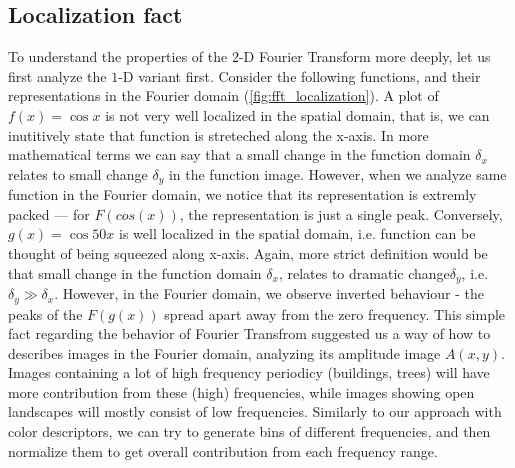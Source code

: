 \documentclass{report}
\begin{document}
\subsection{Localization fact}
To understand the properties of the $2$-D Fourier Transform more deeply, let us first analyze the $1$-D variant first. Consider the following functions, and their representations in the Fourier domain (\ref{fig:fft_localization}). A plot of $f(x)=\cos {x}$ is not very well localized in the spatial domain, that is, we can inutitively state that function is streteched along the x-axis. In more mathematical terms we can say that a small change in the function domain $\delta_x$ relates to small change $\delta_y$ in the function image.  However, when we analyze same function in the Fourier domain, we notice that its representation is extremly packed --- for $F(cos(x))$, the representation is just a single peak. Conversely, $g(x)=\cos {50x}$ is well localized in the spatial domain, i.e. function can be thought of being squeezed along x-axis. Again, more strict definition would be that small change in the function domain $\delta_x$, relates to dramatic change$\delta_y$, i.e. $\delta_y \gg \delta_x$. However, in the Fourier domain, we observe inverted behaviour - the peaks of the $F(g(x))$ spread apart away from the zero frequency. This simple fact regarding the behavior of Fourier Transfrom suggested us a way of how to describes images in the Fourier domain, analyzing its amplitude image $A(x,y)$. Images containing a lot of high frequency periodicy (buildings, trees) will have more contribution from these (high) frequencies, while images showing open landscapes will mostly consist of low frequencies. Similarly to our approach with color descriptors, we can try to generate bins of different frequencies, and then normalize them to get overall contribution from each frequency range.
\end{document}
